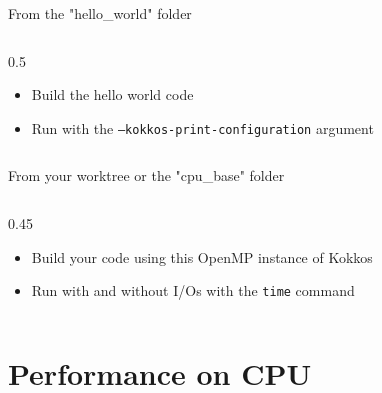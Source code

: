 \documentclass[
    aspectratio=169,
]{beamer}
\begin{document}
\begin{exerciseframe}{From the "hello\_world" folder}
    \begin{columns}
        \begin{column}{0.5\linewidth}
            \begin{itemize}
                \item Build the hello world code
                \item Run with the \texttt{--kokkos-print-configuration} argument
            \end{itemize}
        \end{column}
    \end{columns}
\end{exerciseframe}

\begin{exerciseframe}{\small From your worktree or the "cpu\_base" folder}
    \begin{columns}
        \begin{column}{0.45\linewidth}
            \begin{itemize}
                \item Build your code using this OpenMP instance of Kokkos
                \item Run with and without I/Os with the \texttt{time} command
            \end{itemize}
        \end{column}
    \end{columns}
\end{exerciseframe}

\section{Performance on CPU}
\end{document}

